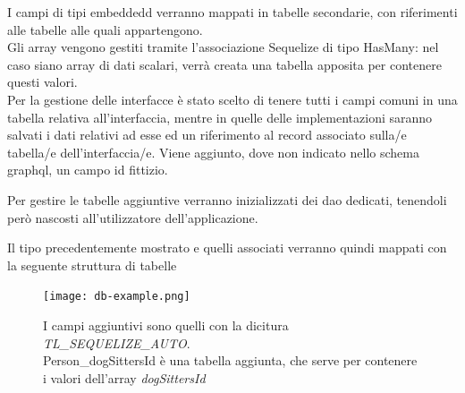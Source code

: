 \documentclass[a4paper, 12pt]{scrartcl}
\begin{document}
      I campi di tipi embeddedd verranno mappati in tabelle secondarie, con riferimenti alle tabelle alle quali appartengono.\\
      Gli array vengono gestiti tramite l'associazione Sequelize di tipo HasMany: nel caso siano array di dati scalari, verrà creata una tabella apposita per contenere questi valori. \\
      Per la gestione delle interfacce è stato scelto di tenere tutti i campi comuni in una tabella relativa all'interfaccia, mentre in quelle delle implementazioni saranno salvati i dati relativi ad esse ed un riferimento al record associato sulla/e tabella/e dell'interfaccia/e.
      Viene aggiunto, dove non indicato nello schema graphql, un campo id fittizio.

      Per gestire le tabelle aggiuntive verranno inizializzati dei dao dedicati, tenendoli però nascosti all'utilizzatore dell'applicazione.

      Il tipo precedentemente mostrato e quelli associati verranno quindi mappati con la seguente struttura di tabelle\\
      
      \begin{figure}[H]
        \texttt{[image: db-example.png]}
        \caption{I campi aggiuntivi sono quelli con la dicitura \emph{TL_SEQUELIZE_AUTO}.\\Person_dogSittersId è una tabella aggiunta, che serve per contenere i valori dell'array \emph{dogSittersId}}
      \end{figure}
\end{document}
